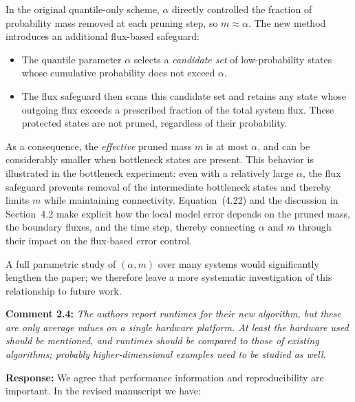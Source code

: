 \documentclass[11pt]{article}
\begin{document}
In the original quantile-only scheme, $\alpha$ directly controlled the fraction of
probability mass removed at each pruning step, so $m \approx \alpha$. The new
method introduces an additional flux-based safeguard:

\begin{itemize}
  \item The quantile parameter $\alpha$ selects a \emph{candidate set} of low-probability
        states whose cumulative probability does not exceed $\alpha$.
  \item The flux safeguard then scans this candidate set and retains any state
        whose outgoing flux exceeds a prescribed fraction of the total system flux.
        These protected states are not pruned, regardless of their probability.
\end{itemize}

As a consequence, the \emph{effective} pruned mass $m$ is at most $\alpha$, and can
be considerably smaller when bottleneck states are present. This behavior is
illustrated in the bottleneck experiment: even with a relatively large $\alpha$, the
flux safeguard prevents removal of the intermediate bottleneck states and thereby
limits $m$ while maintaining connectivity. Equation~(4.22) and the discussion in
Section~4.2 make explicit how the local model error depends on the pruned mass, the
boundary fluxes, and the time step, thereby connecting $\alpha$ and $m$ through
their impact on the flux-based error control.

A full parametric study of $(\alpha,m)$ over many systems would significantly
lengthen the paper; we therefore leave a more systematic investigation of this
relationship to future work.

\vspace{0.5em}

\noindent\textbf{Comment 2.4:} \textit{The authors report runtimes for their new algorithm, but these are
only average values on a single hardware platform. At least the hardware used
should be mentioned, and runtimes should be compared to those of existing
algorithms; probably higher-dimensional examples need to be studied as well.}

\textbf{Response:} We agree that performance information and reproducibility are
important. In the revised manuscript we have:
\end{document}
